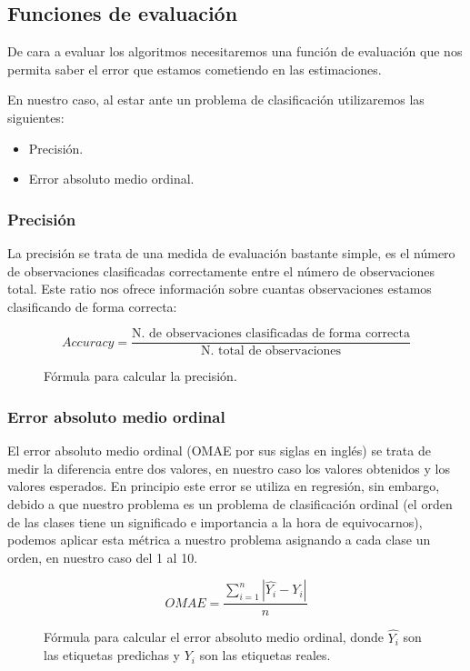 \newpage

\subsection{Funciones de evaluación}

De cara a evaluar los algoritmos necesitaremos una función de evaluación que nos permita saber el error que estamos cometiendo en las estimaciones.

En nuestro caso, al estar ante un problema de clasificación utilizaremos las siguientes:

\begin{itemize}
	\item Precisión.
	\item Error absoluto medio ordinal.
\end{itemize}

\subsubsection{Precisión}

La precisión se trata de una medida de evaluación bastante simple, es el número de observaciones clasificadas correctamente entre el número de observaciones total. Este ratio nos ofrece información sobre cuantas observaciones estamos clasificando de forma correcta:

\begin{figure}[H]
	 \centering
	 $$ Accuracy = \frac{\text{N. de observaciones clasificadas de forma correcta}}{\text{N. total de observaciones}} $$
	 \caption{Fórmula para calcular la precisión.}
	\label{fig:Accuracy}
\end{figure}

\subsubsection{Error absoluto medio ordinal}

El error absoluto medio ordinal (OMAE por sus siglas en inglés) se trata de medir la diferencia entre dos valores, en nuestro caso los valores obtenidos y los valores esperados. En principio este error se utiliza en regresión, sin embargo, debido a que nuestro problema es un problema de clasificación ordinal (el orden de las clases tiene un significado e importancia a la hora de equivocarnos), podemos aplicar esta métrica a nuestro problema asignando a cada clase un orden, en nuestro caso del 1 al 10.

\begin{figure}[H]
	 \centering
	 $$ OMAE = \frac{\sum_{i = 1}^{n}|\hat{Y_i} - Y_i|}{n} $$
	 \caption{Fórmula para calcular el error absoluto medio ordinal, donde $\hat{Y_i}$ son las etiquetas predichas y $Y_i$ son las etiquetas reales.}
	\label{fig:MAE}
\end{figure}


\newpage
